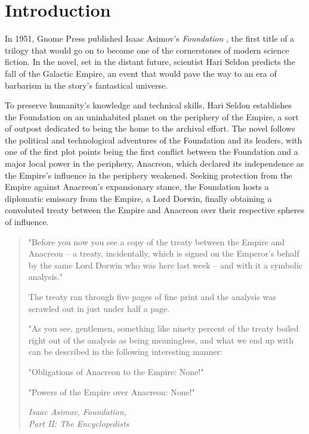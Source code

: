 \section{Introduction}

In 1951, Gnome Press published Isaac Asimov's \emph{Foundation} \citep{asimov1951foundation}, the first title of a trilogy that would go on to become one of the cornerstones of modern science fiction.
In the novel, set in the distant future, scientist Hari Seldon predicts the fall of the Galactic Empire, an event that would pave the way to an era of barbarism in the story's fantastical universe.

To preserve humanity's knowledge and technical skills, Hari Seldon establishes the Foundation on an uninhabited planet on the periphery of the Empire, a sort of outpost dedicated to being the home to the archival effort.
The novel follows the political and technological adventures of the Foundation and its leaders, with one of the first plot points being the first conflict between the Foundation and a major local power in the periphery, Anacreon, which declared its independence as the Empire's influence in the periphery weakened.
Seeking protection from the Empire against Anacreon's expansionary stance, the Foundation hosts a diplomatic emissary from the Empire, a Lord Dorwin, finally obtaining a convoluted treaty between the Empire and Anacreon over their respective spheres of influence.

\begin{quote}
    "Before you now you see a copy of the treaty between the Empire and Anacreon – a treaty, incidentally, which is signed on the Emperor's behalf by the same Lord Dorwin who was here last week – and with it a symbolic analysis."

    The treaty ran through five pages of fine print and the analysis was scrawled out in just under half a page.

    "As you see, gentlemen, something like ninety percent of the treaty boiled right out of the analysis as being meaningless, and what we end up with can be described in the following interesting manner:

    "Obligations of Anacreon to the Empire: None!"

    "Powers of the Empire over Anacreon: None!"

    \vspace{0.2cm}

    \begin{flushright}
        \small \emph{Isaac Asimov, Foundation,\\Part II: The Encyclopedists}
    \end{flushright}
\end{quote}

